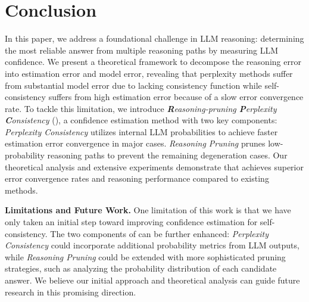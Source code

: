 \section{Conclusion} \label{sec:concl}

In this paper, we address a foundational challenge in LLM reasoning: determining the most reliable answer from multiple reasoning paths by measuring LLM confidence. 
We present a theoretical framework to decompose the reasoning error into estimation error and model error, revealing that perplexity methods suffer from substantial model error due to lacking consistency function while self-consistency suffers from high estimation error because of a slow error convergence rate. 
To tackle this limitation, we introduce \emph{\textbf{R}easoning-pruning \textbf{P}erplexity \textbf{C}onsistency} (\RPC), a confidence estimation method with two key components: 
\emph{Perplexity Consistency} utilizes internal LLM probabilities to achieve faster estimation error convergence in major cases. 
\emph{Reasoning Pruning} prunes low-probability reasoning paths to prevent the remaining degeneration cases. 
Our theoretical analysis and extensive experiments demonstrate that \RPC achieves superior error convergence rates and reasoning performance compared to existing methods.

\textbf{Limitations and Future Work.} One limitation of this work is that we have only taken an initial step toward improving confidence estimation for self-consistency. The two components of \RPC can be further enhanced: \emph{Perplexity Consistency} could incorporate additional probability metrics from LLM outputs, while \emph{Reasoning Pruning} could be extended with more sophisticated pruning strategies, such as analyzing the probability distribution of each candidate answer. We believe our initial approach and theoretical analysis can guide future research in this promising direction. 
